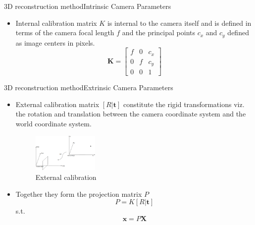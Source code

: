 \documentclass{beamer}
\begin{document}

\begin{frame}{3D reconstruction method}{Intrinsic Camera Parameters}
  \begin{itemize} 
    \item Internal calibration matrix  $K$ is internal to the camera itself and is defined in terms of the  camera focal length $f$ and the principal points $c_x$ and  $c_y$ defined as image centers in pixels.
  \begin{equation}
   \mathbf{K}  = 
    \begin{bmatrix}
    f & 0 & c_x \\ 0 & f & c_y \\
    0 & 0 & 1 
    \end{bmatrix}
  \end{equation}
  \end{itemize}
\end{frame}

\begin{frame}{3D reconstruction method}{Extrinsic Camera Parameters}
 \begin{itemize}
  \item External calibration matrix $[R|\textbf{t}]$ constitute the rigid transformations viz. the rotation and translation between the camera coordinate system and the world coordinate system.
  \begin{figure}
    \centering
    \includegraphics[width=0.3\textwidth]{CameraWorld.png}
    \caption{External calibration}
  \end{figure}
  \item Together they form the projection matrix $P$
  \begin{equation*}
    P = K[R|\textbf{t}]
    \end{equation*}
    s.t. \begin{equation*} \mathbf{x} = P\mathbf{X} \end{equation*}
  \end{itemize}
\end{frame}
\end{document}
